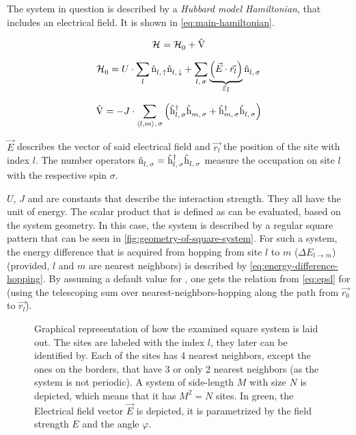 The system in question is described by a \emph{Hubbard model Hamiltonian}, that includes an electrical field. It is shown in \autoref{eq:main-hamiltonian}.


\begin{equation}
    \label{eq:main-hamiltonian}
    \pictureHamiltonian = \HzeroHamiltonian + \Vhamiltonian
\end{equation}

\begin{equation}
    \label{eq:main-hamiltonian-h0}
    \HzeroHamiltonian = U \cdot \lsum \nop{l}{\up}\nop{l}{\down} + \lsum[l,\,\sigma] \underbrace{\left(\vec{E} \cdot \vec{r_l}\right)}_{\text{\normalsize \epsl}} \nop{l}{\sigma}
\end{equation}

\begin{equation}
    \label{eq:main-hamiltonian-perturbation}
    \Vhamiltonian =  - J \cdot \neighborsumWSpin{l}{m}{\sigma} \left(\withspinhcop{l}{\sigma}{\dagger} \withspinhcop{m}{\sigma}{} + \withspinhcop{m}{\sigma}{\dagger} \withspinhcop{l}{\sigma}{} \right)
\end{equation}

$\vec{E}$ describes the vector of said electrical field and $\vec{r_l}$ the position of the site with index $l$.
The number operators $\hat{\text{n}}^{ }_{l,\,\sigma} = \hat{\text{h}}^{\dagger }_{l,\,\sigma}\hat{\text{h}}^{ }_{l,\,\sigma}$ measure the occupation on site $l$ with the respective spin $\sigma$. 

$U$, $J$ and \epsl[] are constants that describe the interaction strength. 
They all have the unit of energy. 
The scalar product that is defined as \epsl[] can be evaluated, based on the system geometry. 
In this case, the system is described by a regular square pattern that can be seen in \autoref{fig:geometry-of-square-system}. 
For such a system, the energy difference that is acquired from hopping from site $l$ to $m$ ($\Delta E_{l \rightarrow m}$) (provided, $l$ and $m$ are nearest neighbors) is described by \autoref{eq:energy-difference-hopping}. By assuming a default value for \epsl[0], one gets the relation from \autoref{eq:epsl} for \epsl{} (using the telescoping sum over nearest-neighbors-hopping along the path from $\vec{r_0}$ to $\vec{r_l}$). 

\begin{figure}[htbp]
    \centering
            
    \vspace{0.8cm}
    \caption{Graphical representation of how the examined square system is laid out. The sites are labeled with the index $l$, they later can be identified by. Each of the sites has 4 nearest neighbors, except the ones on the borders, that have 3 or only 2 nearest neighbors (as the system is not periodic). A system of side-length $M$ with size $N$ is depicted, which means that it has $M^2 = N$ sites.
    In green, the Electrical field vector $\vec{E}$ is depicted, it is parametrized by the field strength $E$ and the angle $\varphi$.}
    \label{fig:geometry-of-square-system}
\end{figure}

